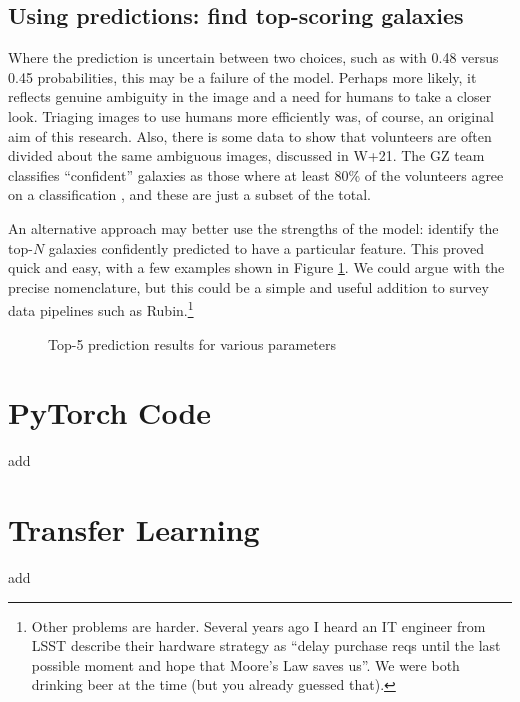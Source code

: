 \documentclass[preprint]{aastex631}
\newcommand{\todo}{\color{red}{TODO}\color{black}\hspace{2mm}}
\begin{document}
\subsection{Using predictions: find top-scoring galaxies}

Where the prediction is uncertain between two choices, such as with 0.48 versus 0.45 probabilities, this may be a failure of the model. Perhaps more likely, it reflects genuine ambiguity in the image and a need for humans to take a closer look. Triaging images to use humans more efficiently was, of course, an original aim of this research. Also, there is some data to show that volunteers are often divided about the same ambiguous images, discussed in W+21. The GZ team classifies ``confident'' galaxies as those where at least 80\% of the volunteers agree on a classification \citep{2019MNRAS.484...93D}, and these are just a subset of the total.

An alternative approach may better use the strengths of the model: identify the top-$N$ galaxies confidently predicted to have a particular feature. This proved quick and easy, with a few examples shown in Figure \ref{fig:top5}. We could argue with the precise nomenclature, but this could be a simple and useful addition to survey data pipelines such as Rubin.\footnote{Other problems are harder. Several years ago I heard an IT engineer from LSST describe their hardware strategy as ``delay purchase reqs until the last possible moment and hope that Moore's Law saves us''. We were both drinking beer at the time (but you already guessed that).}

\begin{figure}
	\caption{Top-5 prediction results for various parameters \label{fig:top5}}
\end{figure}


\section{PyTorch Code}


\todo add 

\section{Transfer Learning}

\todo add 



{}

\end{document}
